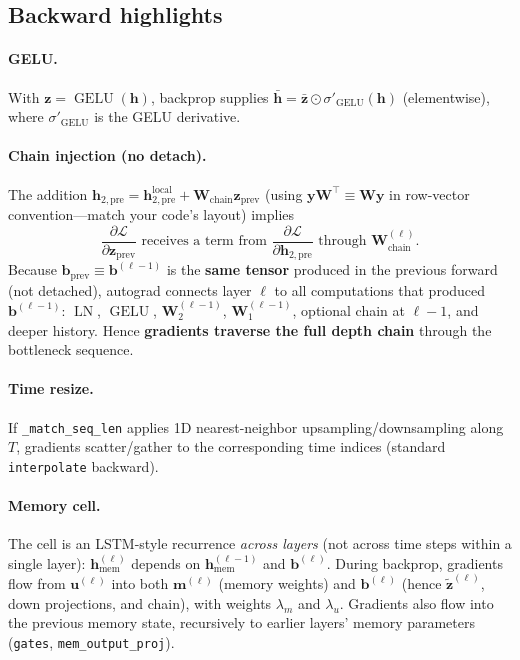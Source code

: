 \documentclass[11pt]{article}
\newcommand{\gelu}{\operatorname{GELU}}
\newcommand{\LN}{\operatorname{LN}}
\begin{document}
\subsection{Backward highlights}
\paragraph{GELU.}
With $\bm{z} = \gelu(\bm{h})$, backprop supplies $\bar{\bm{h}} = \bar{\bm{z}} \odot \sigma'_{\gelu}(\bm{h})$ (elementwise), where $\sigma'_{\gelu}$ is the GELU derivative.

\paragraph{Chain injection (no detach).}
The addition $\bm{h}_{2,\mathrm{pre}} = \bm{h}_{2,\mathrm{pre}}^{\mathrm{local}} + \bm{W}_{\mathrm{chain}}\bm{z}_{\mathrm{prev}}$ (using $\bm{y}\bm{W}^\top \equiv \bm{W}\bm{y}$ in row-vector convention---match your code's layout) implies
\begin{equation}
  \frac{\partial \mathcal{L}}{\partial \bm{z}_{\mathrm{prev}}}
  \text{ receives a term from }
  \frac{\partial \mathcal{L}}{\partial \bm{h}_{2,\mathrm{pre}}}
  \text{ through } \bm{W}_{\mathrm{chain}}^{(\ell)}.
\end{equation}
Because $\bm{b}_{\mathrm{prev}} \equiv \bm{b}^{(\ell-1)}$ is the \textbf{same tensor} produced in the previous forward (not detached), autograd connects layer $\ell$ to all computations that produced $\bm{b}^{(\ell-1)}$: $\LN$, $\gelu$, $\bm{W}_2^{(\ell-1)}$, $\bm{W}_1^{(\ell-1)}$, optional chain at $\ell-1$, and deeper history. Hence \textbf{gradients traverse the full depth chain} through the bottleneck sequence.

\paragraph{Time resize.}
If \texttt{\_match\_seq\_len} applies 1D nearest-neighbor upsampling/downsampling along $T$, gradients scatter/gather to the corresponding time indices (standard \texttt{interpolate} backward).

\paragraph{Memory cell.}
The cell is an LSTM-style recurrence \emph{across layers} (not across time steps within a single layer): $\bm{h}_{\mathrm{mem}}^{(\ell)}$ depends on $\bm{h}_{\mathrm{mem}}^{(\ell-1)}$ and $\bm{b}^{(\ell)}$. During backprop, gradients flow from $\bm{u}^{(\ell)}$ into both $\bm{m}^{(\ell)}$ (memory weights) and $\bm{b}^{(\ell)}$ (hence $\tilde{\bm{z}}^{(\ell)}$, down projections, and chain), with weights $\lambda_m$ and $\lambda_u$. Gradients also flow into the previous memory state, recursively to earlier layers' memory parameters (\texttt{gates}, \texttt{mem\_output\_proj}).
\end{document}
